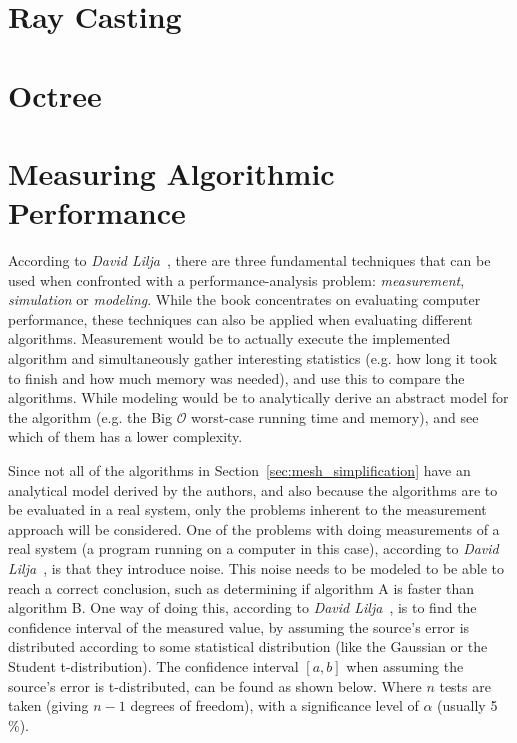\section{Ray Casting} \label{sec:ray_casting}


\section{Octree} \label{sec:octree}


\section{Measuring Algorithmic Performance} \label{sec:measuring_algorithmic_performance}

According to \emph{David Lilja}~\cite[p.~4]{lilja2005measuring}, there are three fundamental techniques that can be used when confronted with a performance-analysis problem: \emph{measurement}, \emph{simulation} or \emph{modeling}. While the book concentrates on evaluating computer performance, these techniques can also be applied when evaluating different algorithms. Measurement would be to actually execute the implemented algorithm and simultaneously gather interesting statistics (e.g. how long it took to finish and how much memory was needed), and use this to compare the algorithms. While modeling would be to analytically derive an abstract model for the algorithm (e.g. the Big \(\mathcal{O}\) worst-case running time and memory), and see which of them has a lower complexity.

Since not all of the algorithms in Section~\ref{sec:mesh_simplification} have an analytical model derived by the authors, and also because the algorithms are to be evaluated in a real system, only the problems inherent to the measurement approach will be considered. One of the problems with doing measurements of a real system (a program running on a computer in this case), according to \emph{David Lilja}~\cite[p.~43]{lilja2005measuring}, is that they introduce noise. This noise needs to be modeled to be able to reach a correct conclusion, such as determining if algorithm A is faster than algorithm B. One way of doing this, according to \emph{David Lilja}~\cite[p.~48]{lilja2005measuring}, is to find the confidence interval of the measured value, by assuming the source's error is distributed according to some statistical distribution (like the Gaussian or the Student t-distribution). The confidence interval \([a,b]\) when assuming the source's error is t-distributed, can be found as shown below. Where \(n\) tests are taken (giving \(n-1\) degrees of freedom), with a significance level of \(\alpha\) (usually 5 \%).

